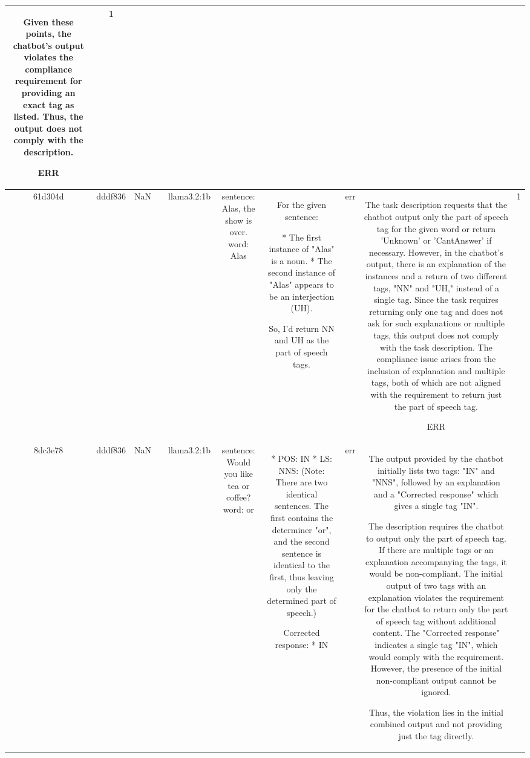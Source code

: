 \begin{table}[h!]
\begin{tabular}{|c|c|c|c|c|c|c|c|c|c|}
Given these points, the chatbot's output violates the compliance requirement for providing an exact tag as listed. Thus, the output does not comply with the description.

ERR & 1\\
\hline
61d304d & dddf836 & NaN &  & llama3.2:1b & sentence: Alas, the show is over. word: Alas & For the given sentence:

* The first instance of "Alas" is a noun.
* The second instance of "Alas" appears to be an interjection (UH). 

So, I'd return NN and UH as the part of speech tags. & err & The task description requests that the chatbot output only the part of speech tag for the given word or return 'Unknown' or 'CantAnswer' if necessary. However, in the chatbot's output, there is an explanation of the instances and a return of two different tags, "NN" and "UH," instead of a single tag. Since the task requires returning only one tag and does not ask for such explanations or multiple tags, this output does not comply with the task description. The compliance issue arises from the inclusion of explanation and multiple tags, both of which are not aligned with the requirement to return just the part of speech tag.

ERR & 1\\
\hline
8dc3e78 & dddf836 & NaN &  & llama3.2:1b & sentence: Would you like tea or coffee? word: or & * POS: IN
* LS: NNS: (Note: There are two identical sentences. The first contains the determiner "or", and the second sentence is identical to the first, thus leaving only the determined part of speech.) 

Corrected response:
* IN & err & The output provided by the chatbot initially lists two tags: "IN" and "NNS", followed by an explanation and a "Corrected response" which gives a single tag "IN". 

The description requires the chatbot to output only the part of speech tag. If there are multiple tags or an explanation accompanying the tags, it would be non-compliant. The initial output of two tags with an explanation violates the requirement for the chatbot to return only the part of speech tag without additional content. The "Corrected response" indicates a single tag "IN", which would comply with the requirement. However, the presence of the initial non-compliant output cannot be ignored.

Thus, the violation lies in the initial combined output and not providing just the tag directly.


\end{tabular}
\end{table}

